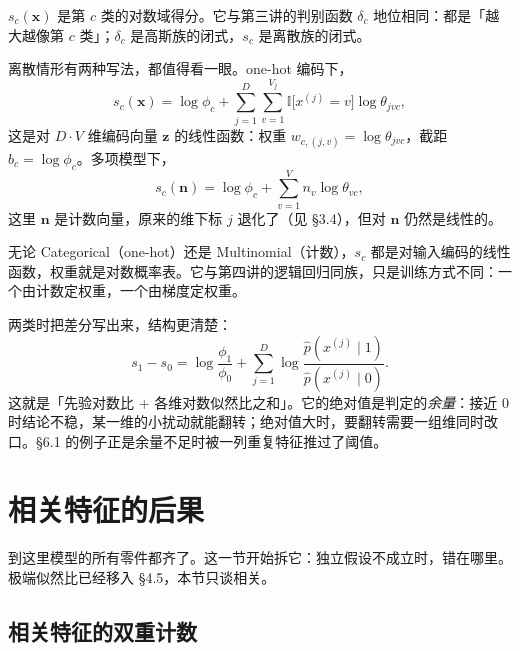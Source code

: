 \documentclass[11pt,a4paper,fontset=windows,zihao=-4]{ctexart}
\newcommand{\bx}{\mathbf{x}}
\newcommand{\bz}{\mathbf{z}}
\newcommand{\bn}{\mathbf{n}}
\begin{document}
\begin{dfn}[类得分]
$s_c(\bx)$ 是第 $c$ 类的对数域得分。它与第三讲的判别函数 $\delta_c$ 地位相同：都是「越大越像第 $c$ 类」；$\delta_c$ 是高斯族的闭式，$s_c$ 是离散族的闭式。
\end{dfn}

离散情形有两种写法，都值得看一眼。one-hot 编码下，
\begin{equation}
  s_c(\bx)=\log\phi_c+\sum_{j=1}^{D}\sum_{v=1}^{V_j}\mathbb{I}\bigl[x^{(j)}=v\bigr]\log\theta_{jvc},
  \label{eq:onehot}
\end{equation}
这是对 $D\cdot V$ 维编码向量 $\bz$ 的线性函数：权重 $w_{c,(j,v)}=\log\theta_{jvc}$，截距 $b_c=\log\phi_c$。多项模型下，
\begin{equation}
  s_c(\bn)=\log\phi_c+\sum_{v=1}^{V}n_v\log\theta_{vc},
  \label{eq:count}
\end{equation}
这里 $\bn$ 是计数向量，原来的维下标 $j$ 退化了（见 §3.4），但对 $\bn$ 仍然是线性的。

\begin{keybox}[离散朴素贝叶斯是线性分类器]
无论 Categorical（one-hot）还是 Multinomial（计数），$s_c$ 都是对输入编码的线性函数，权重就是对数概率表。它与第四讲的逻辑回归同族，只是训练方式不同：一个由计数定权重，一个由梯度定权重。
\end{keybox}

两类时把差分写出来，结构更清楚：
\begin{equation}
  s_1-s_0=\log\frac{\phi_1}{\phi_0}
  +\sum_{j=1}^{D}\log\frac{\hat p(x^{(j)}\mid1)}{\hat p(x^{(j)}\mid0)}.
  \label{eq:diffscore}
\end{equation}
这就是「先验对数比 + 各维对数似然比之和」。它的绝对值是判定的\emph{余量}：接近 $0$ 时结论不稳，某一维的小扰动就能翻转；绝对值大时，要翻转需要一组维同时改口。§6.1 的例子正是余量不足时被一列重复特征推过了阈值。


\section{相关特征的后果}

到这里模型的所有零件都齐了。这一节开始拆它：独立假设不成立时，错在哪里。极端似然比已经移入 §4.5，本节只谈相关。

\subsection{相关特征的双重计数}
\end{document}
